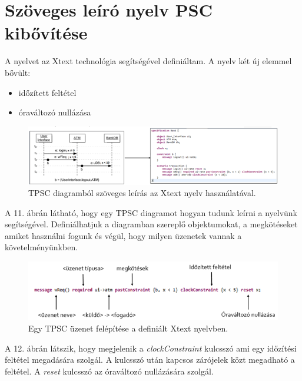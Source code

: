 \chapter{Szöveges leíró nyelv PSC kibővítése}

A nyelvet az Xtext technológia segítségével definiáltam. A nyelv két új elemmel bővült:
\begin{itemize}
    \item időzített feltétel
    \item óraváltozó nullázása
\end{itemize}

\begin{figure}[!ht]
    \centering
    \includegraphics[width=150mm, keepaspectratio]{figures/11abra.png}
    \caption{TPSC diagramból szöveges leírás az Xtext nyelv használatával.}
\end{figure}

A 11. ábrán látható, hogy egy TPSC diagramot hogyan tudunk leírni a nyelvünk segítségével. Definiálhatjuk a diagramban szereplő objektumokat, a megkötéseket amiket használni fogunk és végül, hogy milyen üzenetek vannak a követelményünkben.

\begin{figure}[!ht]
    \centering
    \includegraphics[width=150mm, keepaspectratio]{figures/12abra.png}
    \caption{Egy TPSC üzenet felépítése a definiált Xtext nyelvben.}
\end{figure}

A 12. ábrán látszik, hogy megjelenik a \textit{clockConstraint} kulcsszó ami egy időzítési feltétel megadására szolgál. A kulcsszó után kapcsos zárójelek közt megadható a feltétel. A \textit{reset} kulcsszó az óraváltozó nullázására szolgál.